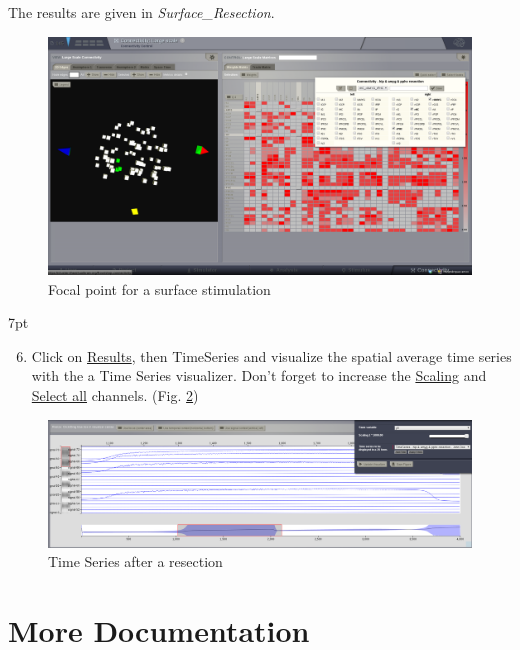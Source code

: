 \documentclass{tufte-handout}
\newenvironment{simulation}{%
  \def\FrameCommand{%
    \hspace{1pt}%
    {\color{ForestGreen}\vrule width 2pt}%
    {\color{simulationshade}\vrule width 4pt}%
    \colorbox{simulationshade}%
  }%
  \MakeFramed{\advance\hsize-\width\FrameRestore}%
  \noindent\hspace{-4.55pt}%
  \begin{adjustwidth}{}{7pt}%
  \vspace{2pt}\vspace{2pt}%
}
{%
  \vspace{2pt}\end{adjustwidth}\endMakeFramed%
}
\begin{document}
The results are given in \textit{Surface\_Resection}.

\begin{figure}[h]
  \includegraphics[width=\linewidth]{Handout_UI_ModellingAnEpilepticPatient_ConnectivityMatrixResection}%
  \caption{Focal point for a surface stimulation}%
  \label{fig:resec}%
\end{figure}

\begin{simulation}
  \begin{enumerate}
    \setcounter{enumi}{5}
  \item Click on \underline{Results}, then TimeSeries and visualize the spatial average time series with the a Time Series visualizer.
  Don't forget to increase the \underline{Scaling} and \underline{Select all} channels. (Fig. \ref{fig:ts_resec})
  \end{enumerate}
\end{simulation}

\begin{figure}[h]
  \includegraphics[width=\linewidth]{Handout_UI_ModellingAnEpilepticPatient_TimeSeriesResection}%
  \caption{Time Series after a resection}%
  \label{fig:ts_resec}%
\end{figure}


\section{More Documentation}\label{sec:more-doc}
\end{document}
